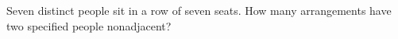 Seven distinct people sit in a row of seven seats. How many arrangements have two specified people nonadjacent?
